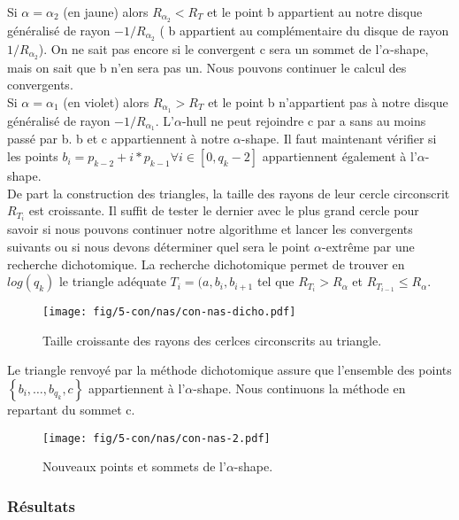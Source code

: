 Si $\alpha = \alpha_{2}$ (en jaune) alors \textbf{$R_{\alpha_{2}} < R_T$} et le point b appartient au notre disque généralisé de rayon $-1/R_{\alpha_{2}}$ ( b appartient au complémentaire du disque de rayon $1/R_{\alpha_{2}}$). On ne sait pas encore si le convergent c sera un sommet de l'$\alpha$-shape, mais on sait que b n'en sera pas un. Nous pouvons continuer le calcul des convergents.\\ 

Si $\alpha = \alpha_{1}$ (en violet) alors \textbf{$R_{\alpha_{1}} > R_T$} et le point b n'appartient pas à notre disque généralisé de rayon $-1/R_{\alpha_{1}}$. L'$\alpha$-hull ne peut rejoindre c par a sans au moins passé par b. b et c appartiennent à notre $\alpha$-shape. Il faut maintenant vérifier si les points $b_i = p_{k-2} + i*p_{k-1} \forall i \in [0, q_k-2]$ appartiennent également à l'$\alpha$-shape. \\

De part la construction des triangles, la taille des rayons de leur cercle circonscrit $R_{T_{i}}$ est croissante. Il suffit de tester le dernier avec le plus grand cercle pour savoir si nous pouvons continuer notre algorithme et lancer les convergents suivants ou si nous devons déterminer quel sera le point $\alpha$-extrême par une recherche dichotomique. La recherche dichotomique permet de trouver en $log(q_k)$ le triangle adéquate $T_i = (a, b_{i}, b_{i+1}$ tel que $R_{T_i} > R_{\alpha}$ et $R_{T_{i-1}} \leq R_{\alpha}$.

\begin{figure}[H]
  \centering
  \texttt{[image: fig/5-con/nas/con-nas-dicho.pdf]}
  \caption{Taille croissante des rayons des cerlces circonscrits au triangle.}
\end{figure}

Le triangle renvoyé par la méthode dichotomique assure que l'ensemble des points $\left\{ b_{i},\ldots, b_{q_k}, c \right\}$ appartiennent à l'$\alpha$-shape. Nous continuons la méthode en repartant du sommet c.
 
\begin{figure}[H]
  \centering
  \texttt{[image: fig/5-con/nas/con-nas-2.pdf]}
  \caption{Nouveaux points et sommets de l'$\alpha$-shape.}
\end{figure}


\subsubsection{Résultats}

